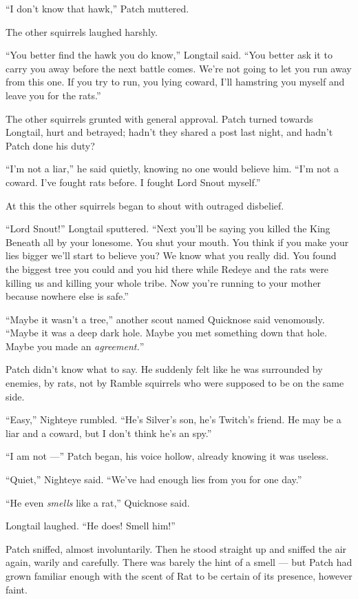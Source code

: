 \documentclass[ebook,oneside,openany,12pt]{memoir}
\begin{document}
“I don’t know that hawk,” Patch muttered.

The other squirrels laughed harshly.

“You better find the hawk you do know,” Longtail said. “You better ask
it to carry you away before the next battle comes. We’re not going to
let you run away from this one. If you try to run, you lying coward,
I’ll hamstring you myself and leave you for the rats.”

The other squirrels grunted with general approval. Patch turned
towards Longtail, hurt and betrayed; hadn’t they shared a post last
night, and hadn’t Patch done his duty?

“I’m not a liar,” he said quietly, knowing no one would believe
him. “I’m not a coward. I’ve fought rats before. I fought Lord Snout
myself.”

At this the other squirrels began to shout with outraged disbelief.

“Lord Snout!” Longtail sputtered. “Next you’ll be saying you killed
the King Beneath all by your lonesome. You shut your mouth. You think
if you make your lies bigger we’ll start to believe you? We know what
you really did. You found the biggest tree you could and you hid there
while Redeye and the rats were killing us and killing your whole
tribe. Now you’re running to your mother because nowhere else is
safe.”

“Maybe it wasn’t a tree,” another scout named Quicknose said
venomously. “Maybe it was a deep dark hole. Maybe you met something
down that hole. Maybe you made an \emph{agreement.}”

Patch didn’t know what to say. He suddenly felt like he was surrounded
by enemies, by rats, not by Ramble squirrels who were supposed to be
on the same side.

“Easy,” Nighteye rumbled. “He’s Silver’s son, he’s Twitch’s friend. He
may be a liar and a coward, but I don’t think he’s an spy.”

“I am not —” Patch began, his voice hollow, already knowing it was
useless.

“Quiet,” Nighteye said. “We’ve had enough lies from you for one day.”

“He even \emph{smells} like a rat,” Quicknose said.

Longtail laughed. “He does! Smell him!”

Patch sniffed, almost involuntarily. Then he stood straight up and
sniffed the air again, warily and carefully. There was barely the hint
of a smell — but Patch had grown familiar enough with the scent of Rat
to be certain of its presence, however faint.
\end{document}
